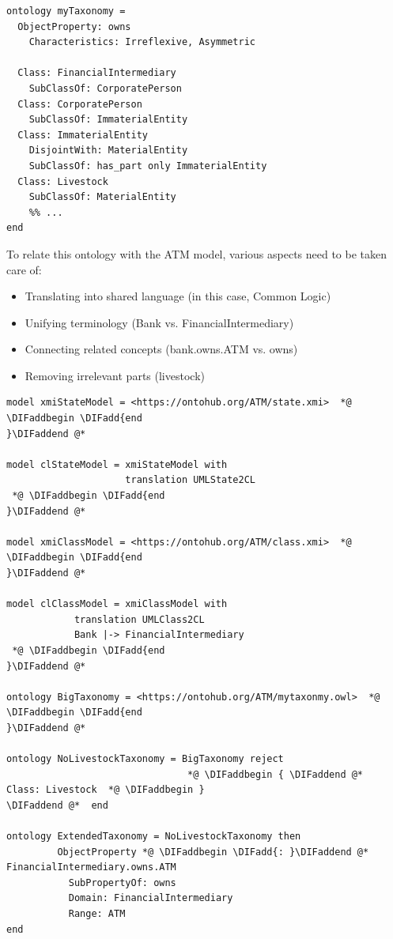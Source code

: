 \documentclass[10pt,fleqn,final]{scrreprt}
\newenvironment{definitions}[0]{\medskip }{}
\providecommand{\DIFadd}[1]{{\protect\color{blue}\uwave{#1}}} %
\providecommand{\DIFaddbegin}{} %
\providecommand{\DIFaddend}{} %
\begin{document}
\begin{definitions}
\begin{lstlisting}[basicstyle=\ttfamily,language=dolText,alsolanguage=owl2Manchester,escapechar=@,mathescape]
ontology myTaxonomy =
  ObjectProperty: owns
    Characteristics: Irreflexive, Asymmetric

  Class: FinancialIntermediary
    SubClassOf: CorporatePerson
  Class: CorporatePerson
    SubClassOf: ImmaterialEntity
  Class: ImmaterialEntity
    DisjointWith: MaterialEntity
    SubClassOf: has_part only ImmaterialEntity
  Class: Livestock
    SubClassOf: MaterialEntity
    %% ...
end
\end{lstlisting}

 To relate this ontology with the ATM model, 
various aspects need to be taken care of:
\begin{itemize}
  \item Translating into shared language  (in this case, Common Logic)
  \item Unifying terminology (Bank vs. FinancialIntermediary)
  \item Connecting related concepts (bank.owns.ATM vs. owns)
  \item Removing irrelevant parts (livestock) 
\end{itemize}

\begin{lstlisting}[basicstyle=\ttfamily\small,language=dolText,alsolanguage=owl2Manchester,escapechar=@,mathescape]
  model xmiStateModel = <https://ontohub.org/ATM/state.xmi>  *@ \DIFaddbegin \DIFadd{end
}\DIFaddend @*  

model clStateModel = xmiStateModel with
                     translation UMLState2CL
 *@ \DIFaddbegin \DIFadd{end
}\DIFaddend @*  

model xmiClassModel = <https://ontohub.org/ATM/class.xmi>  *@ \DIFaddbegin \DIFadd{end
}\DIFaddend @*  

model clClassModel = xmiClassModel with
            translation UMLClass2CL
            Bank |-> FinancialIntermediary
 *@ \DIFaddbegin \DIFadd{end
}\DIFaddend @*  

ontology BigTaxonomy = <https://ontohub.org/ATM/mytaxonmy.owl>  *@ \DIFaddbegin \DIFadd{end
}\DIFaddend @*  

ontology NoLivestockTaxonomy = BigTaxonomy reject
                                *@ \DIFaddbegin { \DIFaddend @*  Class: Livestock  *@ \DIFaddbegin }
\DIFaddend @*  end

ontology ExtendedTaxonomy = NoLivestockTaxonomy then
         ObjectProperty *@ \DIFaddbegin \DIFadd{: }\DIFaddend @*  FinancialIntermediary.owns.ATM
           SubPropertyOf: owns
           Domain: FinancialIntermediary
           Range: ATM
end


\end{lstlisting}
\end{definitions}
\end{document}
